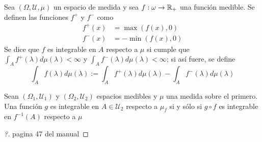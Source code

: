 \begin{definicion}
Sea $(\Omega, \mathcal{U}, \mu)$ un espacio de medida y sea $f:\omega \rightarrow \mathbb{R}_+$ una función medible. Se definen las funciones $f^{+}$ y $f^{-}$ como
\begin{align*}
f^{+}(x) &= \max (f(x), 0 ) \\
f^{-}(x) &= -\min (f(x), 0 )
\end{align*}
Se dice que $f$ es integrable en $A$ respecto a $\mu$ si cumple que $\int_A f^{+}(\lambda) d\mu(\lambda) < \infty$ y $\int_A f^{-}(\lambda) d\mu(\lambda) < \infty$; si así fuere, se define
\begin{equation}
\int_A f(\lambda) d\mu(\lambda) := \int_A f^{+}(\lambda) d\mu(\lambda) - \int_A f^{-}(\lambda) d\mu(\lambda)
\end{equation}
\end{definicion}

\begin{definicion}
Sean $(\Omega_1,\mathcal{U}_1)$ y $(\Omega_2,\mathcal{U}_2)$ espacios medibles y $\mu$ una medida sobre el primero. Una función $g$ es integrable en $A \in \mathcal{U_2}$ respecto a $\mu_f$ si y sólo si $g \circ f$ es integrable en $f^{-1}(A)$ respecto a $\mu$
\end{definicion}
\begin{proof}
[?] pagina 47 del manual
\end{proof}

%


